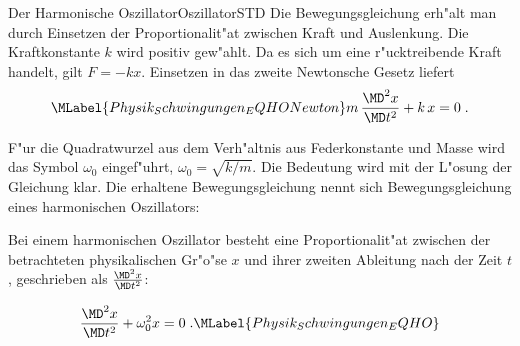 \begin{MXContent}{Der Harmonische Oszillator}{Oszillator}{STD}
Die Bewegungsgleichung erh"alt man durch Einsetzen der Proportionalit"at zwischen Kraft und Auslenkung. Die Kraftkonstante $k$ wird positiv gew"ahlt. Da es sich um eine r"ucktreibende Kraft handelt, gilt $F=-k x$. Einsetzen in das zweite Newtonsche Gesetz liefert
\begin{equation}\MLabel{Physik_Schwingungen_EQHONewton}
  m\, \frac{\MD^2 x }{\MD t^2} + k\,x = 0\; .
\end{equation}

F"ur die Quadratwurzel aus dem Verh"altnis aus Federkonstante und Masse wird das Symbol $\omega_0$ eingef"uhrt, $\omega_0 = \sqrt{k/m}$. Die Bedeutung wird mit der L"osung der Gleichung klar. Die erhaltene Bewegungsgleichung nennt sich Bewegungsgleichung eines harmonischen Oszillators:
\begin{MInfo}
Bei einem harmonischen Oszillator besteht eine Proportionalit"at zwischen der 
betrachteten physikalischen Gr"o"se $x$ und ihrer zweiten Ableitung nach der Zeit $t$, geschrieben als $\frac{\MD^2x}{\MD t^2}$:

\begin{equation}
  \frac{\MD^2x}{\MD t^2} + \omega_0^2 x = 0\;.
  \MLabel{Physik_Schwingungen_EQHO}
\end{equation}

\end{MInfo}


\end{MXContent}
